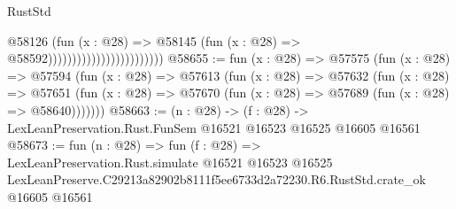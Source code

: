 \begin{lexlean}{RustStd}
\begin{coremodule}
                                              @58126
                                                (fun (x : @28) =>
                                                @58145
                                                  (fun (x : @28) => @58592))))))))))))))))))))))))
@58655 := fun (x : @28) =>
  @57575
    (fun (x : @28) =>
    @57594
      (fun (x : @28) =>
      @57613
        (fun (x : @28) =>
        @57632
          (fun (x : @28) =>
          @57651 (fun (x : @28) => @57670 (fun (x : @28) => @57689 (fun (x : @28) => @58640)))))))
@58663 := (n : @28) ->
  (f : @28) -> LexLeanPreservation.Rust.FunSem @16521 @16523 @16525 @16605 @16561
@58673 := fun (n : @28) =>
  fun (f : @28) =>
  LexLeanPreservation.Rust.simulate
    @16521
    @16523
    @16525
    LexLeanPreserve.C29213a82902b8111f5ee6733d2a72230.R6.RustStd.crate_ok
    @16605
    @16561
\end{coremodule}
\end{lexlean}
